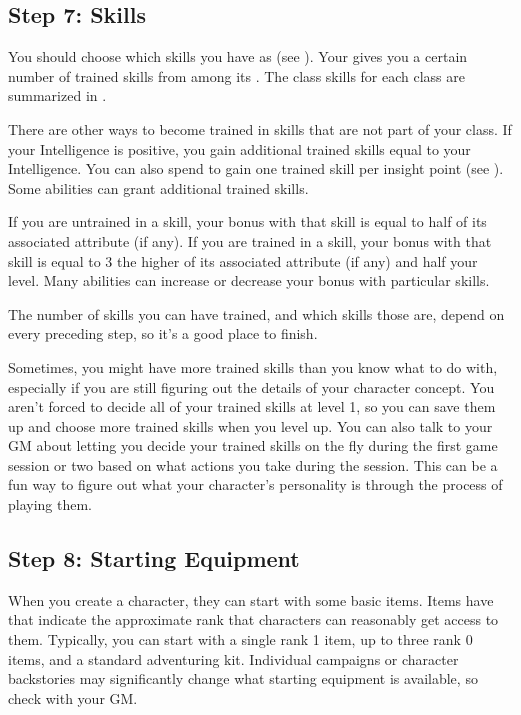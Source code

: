   \subsection{Step 7: Skills}
    You should choose which skills you have as  (see ).
    Your  gives you a certain number of trained skills from among its .
    The class skills for each class are summarized in .

    There are other ways to become trained in skills that are not part of your class.
    If your Intelligence is positive, you gain additional trained skills equal to your Intelligence.
    You can also spend  to gain one trained skill per insight point (see ).
    Some abilities can grant additional trained skills.

    If you are untrained in a skill, your bonus with that skill is equal to half of its associated attribute (if any).
    If you are trained in a skill, your bonus with that skill is equal to 3 \add the higher of its associated attribute (if any) and half your level.
    Many abilities can increase or decrease your bonus with particular skills.

    The number of skills you can have trained, and which skills those are, depend on every preceding step, so it's a good place to finish.

    Sometimes, you might have more trained skills than you know what to do with, especially if you are still figuring out the details of your character concept.
    You aren't forced to decide all of your trained skills at level 1, so you can save them up and choose more trained skills when you level up.
    You can also talk to your GM about letting you decide your trained skills on the fly during the first game session or two based on what actions you take during the session.
    This can be a fun way to figure out what your character's personality is through the process of playing them.

  \subsection{Step 8: Starting Equipment}
    When you create a character, they can start with some basic items.
    Items have  that indicate the approximate rank that characters can reasonably get access to them.
    Typically, you can start with a single rank 1 item, up to three rank 0 items, and a standard adventuring kit.
    Individual campaigns or character backstories may significantly change what starting equipment is available, so check with your GM.

